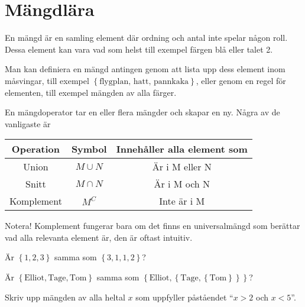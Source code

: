 \section{Mängdlära}

\begin{definition}[Mängd]
En mängd är en samling element där ordning och antal inte spelar någon roll. Dessa element kan vara vad som helst till exempel färgen blå eller talet 2.
\end{definition}

Man kan definiera en mängd antingen genom att lista upp dess element inom måsvingar, till exempel \(\left\{\text{flygplan, hatt, pannkaka} \right\}\), eller genom en regel för elementen, till exempel mängden av alla färger.

\begin{definition}[Mängdoperationer]
	En mängdoperator tar en eller flera mängder och skapar en ny. Några av de vanligaste är
	\begin{center}
		\begin{tabular}{|ccc|}
			\hline
			Operation & Symbol & Innehåller alla element som\\ \hline
			Union & \(M\cup N\) & Är i M eller N \\ \hline
			Snitt & \(M \cap  N\) & Är i M och N \\ \hline
			Komplement & \(M^C\) & Inte är i M \\ \hline
		\end{tabular}
	\end{center}
	Notera! Komplement fungerar bara om det finns en universalmängd som berättar vad alla relevanta element är, den är oftast intuitiv.
\end{definition}

\begin{problem}
	Är \(\left\{1, 2, 3\right\}\) samma som \(\left\{3, 1, 1, 2\right\}\)?
\end{problem}

\begin{problem}
	Är \(\left\{\text{Elliot} , \text{Tage}, \text{Tom} \right\}\) samma som \(\left\{\text{Elliot}, \left\{\text{Tage}, \left\{\text{Tom} \right\} \right\}\right\}\)?
\end{problem}

\begin{problem}
	Skriv upp mängden av alla heltal \(x\) som uppfyller påståendet ``\(x>2\) och \(x <5\)''.
\end{problem}


